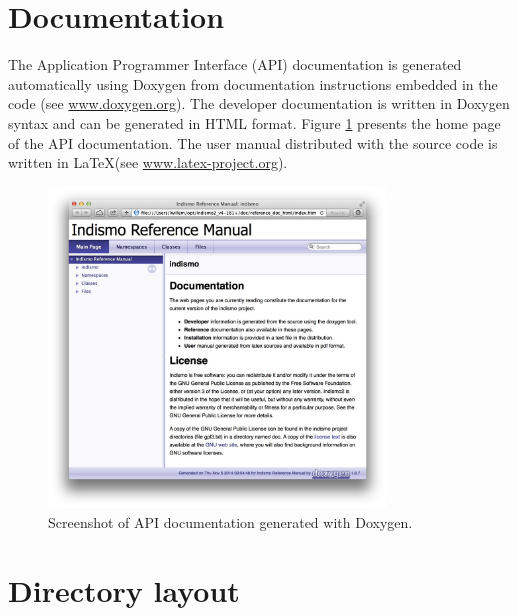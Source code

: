 %
\section{Documentation}
\label{section:documentation}

The Application Programmer Interface (API) documentation is generated automatically using Doxygen from documentation instructions embedded in the code (see \url{www.doxygen.org}). 
The developer documentation is written in Doxygen syntax and can be generated in HTML format. Figure \ref{fig:doxygenapi} presents the home page of the API documentation.
The user manual distributed with the source code is written in \LaTeX (see \url{www.latex-project.org}).

\begin{figure}[h]
	\begin{center}
		\includegraphics[width=0.8\textwidth]{images/screen_shot_doxygen_API.pdf}  
	\end{center}
	\caption{Screenshot of API documentation generated with Doxygen.}
	\label{fig:doxygenapi}
\end{figure}


%
\section{Directory layout}

